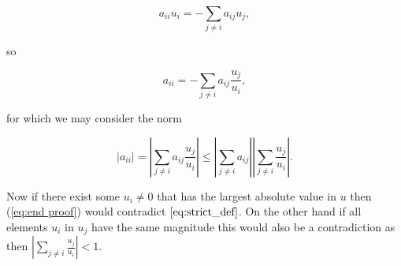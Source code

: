 \documentclass[11pt]{article}
\begin{document}
\begin{equation}
 a_{ii} u_i = - \sum_{j \neq i}a_{ij}u_j ,
\end{equation}

so

\begin{equation}
 a_{ii} = - \sum_{j \neq i}a_{ij} \frac{u_j}{u_i},
\end{equation}

for which we may consider the norm

\begin{equation}
 | a_{ii} | = | \sum_{j \neq i}a_{ij} \frac{u_j}{u_i} | \leq 
              | \sum_{j \neq i}a_{ij}| | \sum_{j \neq i} \frac{u_j}{u_i} |
 .
 \label{eq:end proof}
\end{equation}

Now if there exist some \(u_i \neq 0\) that has the largest absolute
value in \(u\) then (\ref{eq:end proof}) would contradict
\(\ref{eq:strict_def}\). On the other hand if all elements \(u_i\) in
\(u_j\) have the same magnitude this would also be a contradiction as
then \(| \sum_{j \neq i} \frac{u_j}{u_i} | < 1\).


    
    
    
\end{document}
